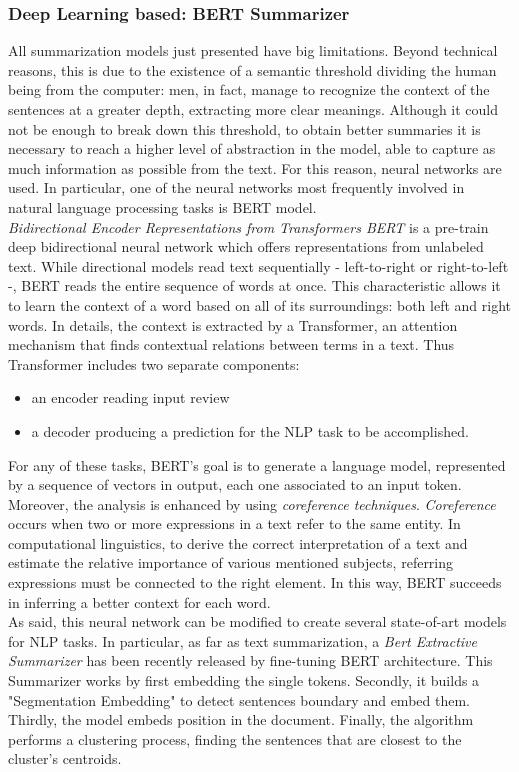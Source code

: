\documentclass[fleqn,10pt]{SelfArx} %
\begin{document}
\subsubsection{Deep Learning based: BERT Summarizer}
All summarization models just presented have big limitations. Beyond technical reasons, this is due to the existence of a semantic threshold dividing the human being from the computer: men, in fact, manage to recognize the context of the sentences at a greater depth, extracting more clear meanings. Although it could not be enough to break down this threshold, to obtain better summaries it is necessary to reach a higher level of abstraction in the model, able to capture as much information as possible from the text. For this reason, neural networks are used. In particular, one of the neural networks most frequently involved in natural language processing tasks is BERT model.\\
\textit{Bidirectional Encoder Representations from Transformers BERT} is a pre-train deep bidirectional neural network which offers representations from unlabeled text. While directional models read text sequentially - left-to-right or right-to-left -, BERT reads the entire sequence of words at once. This characteristic allows it to learn the context of a word based on all of its surroundings: both left and right words. In details, the context is extracted by a Transformer, an attention mechanism that finds contextual relations between terms in a text. Thus Transformer includes two separate components:
\begin{itemize}
    \item an encoder reading input review
    \item a decoder producing a prediction for the NLP task to be accomplished. 
\end{itemize}
For any of these tasks, BERT's goal is to generate a language model, represented by a sequence of vectors in output, each one associated to an input token.\\
Moreover, the analysis is enhanced by using \textit{coreference techniques}. \textit{Coreference} occurs when two or more expressions in a text refer to the same entity. In computational linguistics, to derive the correct interpretation of a text and estimate the relative importance of various mentioned subjects, referring expressions must be connected to the right element. In this way, BERT succeeds in inferring a better context for each word.\\
As said, this neural network can be modified to create several state-of-art models for NLP tasks. In particular, as far as text summarization, a \textit{Bert Extractive Summarizer} has been recently released by fine-tuning BERT architecture. This Summarizer works by first embedding the single tokens. Secondly, it builds a "Segmentation Embedding" to detect sentences boundary and embed them. Thirdly, the model embeds position in the document. Finally, the algorithm performs a clustering process, finding the sentences that are closest to the cluster's centroids.
\end{document}
